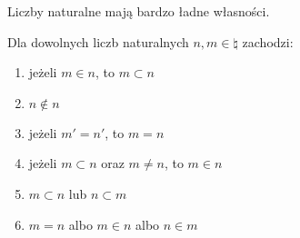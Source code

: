 Liczby naturalne mają bardzo ładne własności.
\begin{lemma}
    Dla dowolnych liczb naturalnych \( n, m \in \natural \) zachodzi:
    \begin{enumerate}
        \item jeżeli \( m \in n \), to \( m \subset n \)
        \item \( n \notin n \)
        \item jeżeli \( m' = n' \), to \( m = n \)
        \item jeżeli \( m \subset n \) oraz \( m \ne n \), to \( m \in n \)
        \item \( m \subset n \) lub \( n \subset m \)
        \item \( m = n \) albo \( m \in n \) albo \( n \in m \)
    \end{enumerate}
\end{lemma}
